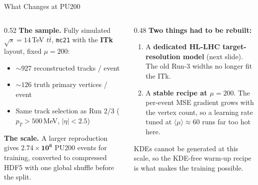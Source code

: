 \documentclass[xcolor=table,aspectratio=169]{beamer}
\begin{document}
\begin{frame}{What Changes at PU200}
    \begin{columns}[t]
        \begin{column}{0.52\linewidth}
            \small
            \textbf{The sample.} Fully simulated $\sqrt{s}=14$\,TeV $t\bar t$,
            \texttt{mc21} with the \textbf{ITk} layout, fixed $\mu=200$:
            \begin{itemize}\setlength\itemsep{0.25em}
                \item $\sim\!927$ reconstructed tracks / event
                \item $\sim\!126$ truth primary vertices / event
                \item Same track selection as Run 2/3 ($p_T>500$\,MeV, $|\eta|<2.5$)
            \end{itemize}
            \vspace{0.35em}
            \textbf{The scale.} A larger reproduction gives
            $\mathbf{2.74\times10^{6}}$ PU200 events for training, converted to
            compressed HDF5 with one global shuffle before the split.
        \end{column}
        \begin{column}{0.48\linewidth}
            \small
            \textbf{Two things had to be rebuilt:}
            \begin{enumerate}\setlength\itemsep{0.35em}
                \item A \textbf{dedicated HL-LHC target-resolution model}
                (next slide). The old Run-3 widths no longer fit the ITk.
                \item A \textbf{stable recipe at $\mu=200$}. The per-event MSE
                gradient grows with the vertex count, so a learning rate tuned at
                $\langle\mu\rangle\!\approx\!60$ runs far too hot here.
            \end{enumerate}
            \vspace{0.35em}
            {\footnotesize\textcolor{black!55}{KDEs cannot be generated at this
            scale, so the KDE-free warm-up recipe is what makes the training
            possible.}}
        \end{column}
    \end{columns}
\end{frame}
\end{document}
